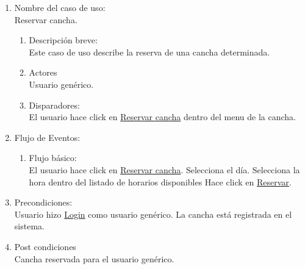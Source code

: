 \documentclass[a4paper,11pt]{article}
\begin{document}
\begin{enumerate}

    \item Nombre del caso de uso: \\
    Reservar cancha.

    \begin{enumerate}
    \item Descripción breve: \\
        Este caso de uso describe la reserva de una cancha determinada.
    \item Actores \\
        Usuario genérico.
    \item Disparadores: \\
        El usuario hace click en \underline{Reservar cancha}
        dentro del menu de la cancha.
    \end{enumerate}

    \item Flujo de Eventos: \\

    \begin{enumerate}

        \item Flujo básico:\\
            El usuario hace click en \underline{Reservar cancha}.
            Selecciona el día.
            Selecciona la hora dentro del listado de horarios disponibles
            Hace click en \underline{Reservar}.
    \end{enumerate}

    \item Precondiciones: \\
        Usuario hizo \underline{Login} como usuario genérico.
        La cancha está registrada en el sistema.

    \item Post condiciones \\
        Cancha reservada para el usuario genérico.

\end{enumerate}

\end{document}
